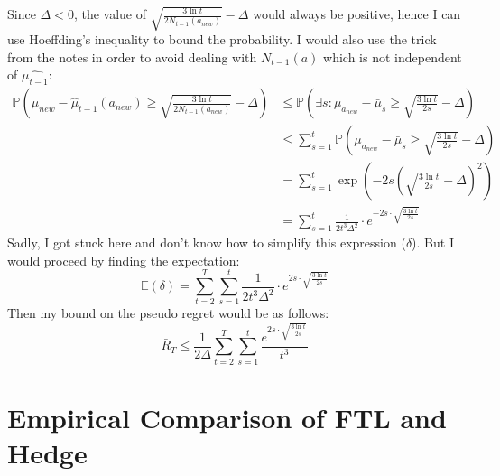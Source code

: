 \documentclass[a4paper]{article}
\newcommand{\expect}[1]{\mathbb{E}\left(#1\right)}
\begin{document}
Since $\Delta < 0$, the value of $\sqrt{\frac{3 \ln t}{2 N_{t-1}(a_{new})}} - \Delta$
would always be positive, hence I can use Hoeffding's inequality to bound the
probability. I would also use the trick from the notes in order to avoid dealing with
$N_{t-1}(a)$ which is not independent of $\hat{\mu_{t-1}}$:
\begin{align*}
  \mathbb{P}\left(
  \mu_{new}-\hat{\mu}_{t-1}(a_{new})
  \geq
  \sqrt{\frac{3 \ln t}{2 N_{t-1}\left(a_{new}\right)}} - \Delta
  \right)
  &\leq
  \mathbb{P}\left(\exists s: \mu_{a_{new}}-\bar{\mu}_{s} \geq \sqrt{\frac{3 \ln
      t}{2 s}} - \Delta\right)\\
  &\leq
  \sum_{s=1}^{t} \mathbb{P}\left(\mu_{a_{new}}-\bar{\mu}_{s} \geq
  \sqrt{\frac{3 \ln t}{2 s}} - \Delta\right)\\
  &=\sum_{s=1}^{t} 
  \operatorname{exp}\left(-2s\left(\sqrt{\frac{3\ln{t}}{2s}}-
    \Delta\right)^2\right)\\
  &=\sum_{s=1}^{t} 
  \frac{1}{2t^3\Delta^2} \cdot e^{-2s\cdot \sqrt{\frac{3\ln{t}}{2s}}}
\end{align*}
Sadly, I got stuck here and don't know how to simplify this expression ($\delta$). But I
would proceed by finding the expectation:
\[
\expect{\delta} = \sum_{t=2}^T \sum_{s=1}^{t} 
  \frac{1}{2t^3\Delta^2} \cdot e^{2s\cdot \sqrt{\frac{3\ln{t}}{2s}}}
\]
Then my bound on the pseudo regret would be as follows:
\[
\bar{R}_{T} \leq \frac{1}{2\Delta}\sum_{t=2}^T\sum_{s=1}^{t} 
  \frac{e^{2s\cdot \sqrt{\frac{3\ln{t}}{2s}}}}{t^3} 
\]


\section{Empirical Comparison of FTL and Hedge}
\label{sec:4}
\end{document}
